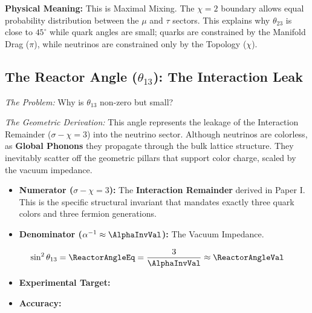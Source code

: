 \textbf{Physical Meaning:} This is Maximal Mixing. The $\chi=2$ boundary allows equal probability distribution between the $\mu$ and $\tau$ sectors. This explains why $\theta_{23}$ is close to $45^\circ$ while quark angles are small; quarks are constrained by the Manifold Drag ($\pi$), while neutrinos are constrained only by the Topology ($\chi$).





\subsection{The Reactor Angle (\texorpdfstring{$\theta_{13}$}{theta13}): The Interaction Leak}

\textit{The Problem:} Why is $\theta_{13}$ non-zero but small?

\textit{The Geometric Derivation:} This angle represents the leakage of the Interaction Remainder ($\sigma - \chi = 3$) into the neutrino sector. Although neutrinos are colorless, as \textbf{Global Phonons} they propagate through the bulk lattice structure. They inevitably scatter off the geometric pillars that support color charge, scaled by the vacuum impedance.

\begin{itemize}
    \item \textbf{Numerator ($\sigma - \chi = 3$):} The \textbf{Interaction Remainder} derived in Paper I. This is the specific structural invariant that mandates exactly three quark colors and three fermion generations.
    \item \textbf{Denominator ($\alpha^{-1} \approx \AlphaInvVal$):} The Vacuum Impedance.
\end{itemize}

\begin{equation}
\sin^2 \theta_{13} = \ReactorAngleEq = \frac{3}{\AlphaInvVal} \approx \mathbf{\ReactorAngleVal}
\end{equation}

\begin{itemize}
    \item \textbf{Experimental Target:} \ReactorAngleExperimentalValue
    \item \textbf{Accuracy:} \ReactorAngleAccText
\end{itemize}

